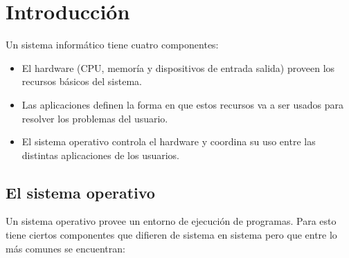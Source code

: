 \section{Introducción}\label{intro}
Un sistema informático tiene cuatro componentes:

\begin{itemize}
	\item El hardware (CPU, memoría y dispositivos de entrada salida) proveen los recursos básicos del sistema.
	\item Las aplicaciones definen la forma en que estos recursos va a ser usados para resolver los problemas del usuario.
	\item El sistema operativo controla el hardware y coordina su uso entre las distintas aplicaciones de los usuarios.
\end{itemize}

\subsection{El sistema operativo}\label{intro::sis_op}
Un sistema operativo provee un entorno de ejecución de programas. Para esto tiene ciertos componentes que difieren de sistema en sistema pero que entre lo más comunes se encuentran:


